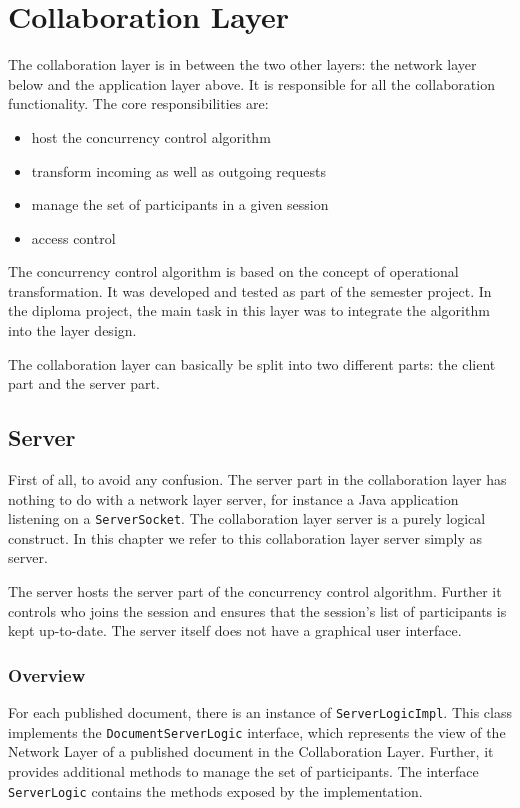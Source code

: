 \chapter{Collaboration Layer}

The collaboration layer is in between the two other layers: the network 
layer below and the application layer above. It is responsible for all the 
collaboration functionality. The core responsibilities are:

\begin{itemize}
 \item host the concurrency control algorithm
 \item transform incoming as well as outgoing requests
 \item manage the set of participants in a given session
 \item access control
\end{itemize}

The concurrency control algorithm is based on the concept of operational 
transformation. It was developed and tested as part of the semester project.
In the diploma project, the main task in this layer was to integrate the
algorithm into the layer design.

The collaboration layer can basically be split into two different parts: the
client part and the server part.


\section{Server} 

First of all, to avoid any confusion. The server part in the collaboration
layer has nothing to do with a network layer server, for instance a Java
application listening on a \texttt{ServerSocket}. The collaboration layer
server is a purely logical construct. In this chapter we refer to
this collaboration layer server simply as server.

The server hosts the server part of the concurrency control algorithm. Further
it controls who joins the session and ensures that the session's list of
participants is kept up-to-date. The server itself does not have a graphical
user interface.

\subsection{Overview}
For each published document, there is an instance of \texttt{ServerLogicImpl}.
This class implements the \texttt{DocumentServerLogic} interface, which 
represents the view of the Network Layer of a published document in the
Collaboration Layer. Further, it provides additional methods to manage
the set of participants. The interface \texttt{ServerLogic} contains
the methods exposed by the implementation.

